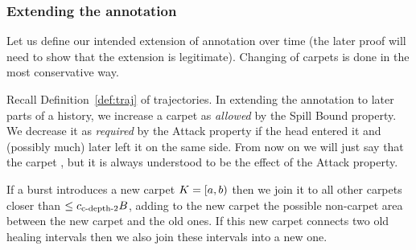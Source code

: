 \documentclass[12pt]{memoir}
\renewcommand{\le}{\leq}
\def\B{B}
\newcommand{\Z}{Z}
\newcommand{\cns}[1]{c_{\textrm{\upshape #1}}}
\newcommand{\cCDepth}[1]{\cns{c-depth-#1}}
\begin{document}





\subsubsection{Extending the annotation}

Let us define our intended extension of annotation over time (the later proof will
need to show that the extension is legitimate).
Changing of carpets is done in the most conservative way.

\begin{definition}[Carpets]\label{def:carpets}
Recall Definition~\ref{def:traj} of trajectories.
In extending the annotation to later parts of a history,
we increase a carpet as \emph{allowed} by the Spill Bound property.
We decrease it as \emph{required} by the Attack property
if the head entered it and (possibly much) later left it on the same side.
From now on we will just say that the carpet , but it is always
understood to be the effect of the Attack property.

If a burst introduces a new carpet \( K=\left[a,b\right) \) then we join it to all other
carpets closer than \( \le\cCDepth2\B \), adding to the new carpet the 
possible non-carpet area between the new carpet and the old ones.
If this new carpet connects two old healing intervals then we also
join these intervals into a new one.
\end{definition}
\end{document}
